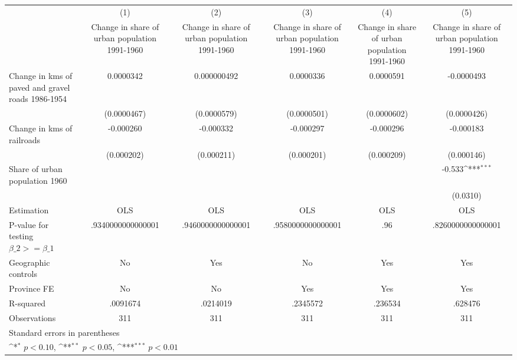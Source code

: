 {
\def\sym#1{\ifmmode^{#1}\else\(^{#1}\)\fi}
\begin{tabular}{l*{5}{c}}
\hline\hline
                    &\multicolumn{1}{c}{(1)}&\multicolumn{1}{c}{(2)}&\multicolumn{1}{c}{(3)}&\multicolumn{1}{c}{(4)}&\multicolumn{1}{c}{(5)}\\
                    &\multicolumn{1}{c}{Change in share of urban population 1991-1960}&\multicolumn{1}{c}{Change in share of urban population 1991-1960}&\multicolumn{1}{c}{Change in share of urban population 1991-1960}&\multicolumn{1}{c}{Change in share of urban population 1991-1960}&\multicolumn{1}{c}{Change in share of urban population 1991-1960}\\
\hline
Change in kms of paved and gravel roads 1986-1954&   0.0000342         & 0.000000492         &   0.0000336         &   0.0000591         &  -0.0000493         \\
                    & (0.0000467)         & (0.0000579)         & (0.0000501)         & (0.0000602)         & (0.0000426)         \\
[1em]
Change in kms of railroads&   -0.000260         &   -0.000332         &   -0.000297         &   -0.000296         &   -0.000183         \\
                    &  (0.000202)         &  (0.000211)         &  (0.000201)         &  (0.000209)         &  (0.000146)         \\
[1em]
Share of urban population 1960&                     &                     &                     &                     &      -0.533\sym{***}\\
                    &                     &                     &                     &                     &    (0.0310)         \\
\hline
Estimation          &         OLS         &         OLS         &         OLS         &         OLS         &         OLS         \\
P-value for testing $\beta\_2 >= \beta\_1$&.9340000000000001         &.9460000000000001         &.9580000000000001         &         .96         &.8260000000000001         \\
Geographic controls &          No         &         Yes         &          No         &         Yes         &         Yes         \\
Province FE         &          No         &          No         &         Yes         &         Yes         &         Yes         \\
R-squared           &    .0091674         &    .0214019         &    .2345572         &     .236534         &     .628476         \\
Observations        &         311         &         311         &         311         &         311         &         311         \\
\hline\hline
\multicolumn{6}{l}{\footnotesize Standard errors in parentheses}\\
\multicolumn{6}{l}{\footnotesize \sym{*} \(p<0.10\), \sym{**} \(p<0.05\), \sym{***} \(p<0.01\)}\\
\end{tabular}
}
